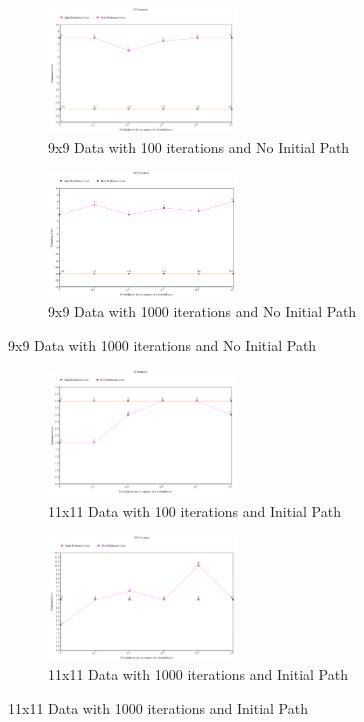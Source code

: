 \documentclass[11pt, oneside]{article}   	%
\begin{document}
\begin{figure}[H]
\centering
\begin{subfigure}{.5\textwidth}
	\centering
	\includegraphics[width=50mm]{9x9downPath.png}
	\caption{9x9 Data with 100 iterations and No Initial Path}
	\label{fig:method}
\end{subfigure}%
\begin{subfigure}{.5\textwidth}
	\centering
	\includegraphics[width=50mm]{9x9downPath2.png}
	\caption{9x9 Data with 1000 iterations and No Initial Path}
	\label{fig:method}
\end{subfigure}
\end{figure}

\begin{figure}[H]
\centering
\begin{subfigure}{.5\textwidth}
	\centering
	\includegraphics[width=50mm]{11x11down.png}
	\caption{11x11 Data with 100 iterations and Initial Path}
	\label{fig:method}
\end{subfigure}%
\begin{subfigure}{.5\textwidth}
	\centering
	\includegraphics[width=50mm]{11x11down2.png}
	\caption{11x11 Data with 1000 iterations and Initial Path}
	\label{fig:method}
\end{subfigure}
\end{figure}
\end{document}
